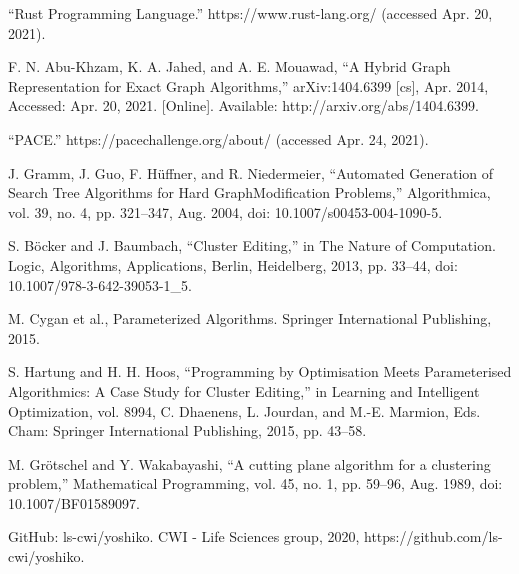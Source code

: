 \documentclass[12pt,oneside,english,parskip=full,headings=small]{scrbook}
\theoremstyle{definition}
\begin{document}
\begin{thebibliography}{99}
“Rust Programming Language.” https://www.rust-lang.org/ (accessed Apr. 20, 2021).

F. N. Abu-Khzam, K. A. Jahed, and A. E. Mouawad, “A Hybrid Graph Representation for Exact Graph
Algorithms,” arXiv:1404.6399 [cs], Apr. 2014, Accessed: Apr. 20, 2021. [Online]. Available:
http://arxiv.org/abs/1404.6399.

“PACE.” https://pacechallenge.org/about/ (accessed Apr. 24, 2021).

J. Gramm, J. Guo, F. Hüffner, and R. Niedermeier, “Automated Generation of Search Tree Algorithms
for Hard GraphModification Problems,” Algorithmica, vol. 39, no. 4, pp. 321–347, Aug. 2004, doi:
10.1007/s00453-004-1090-5.

S. Böcker and J. Baumbach, “Cluster Editing,” in The Nature of Computation. Logic, Algorithms,
Applications, Berlin, Heidelberg, 2013, pp. 33–44, doi: 10.1007/978-3-642-39053-1\_5.

M. Cygan et al., Parameterized Algorithms. Springer International Publishing, 2015.

S. Hartung and H. H. Hoos, “Programming by Optimisation Meets Parameterised Algorithmics: A Case
Study for Cluster Editing,” in Learning and Intelligent Optimization, vol. 8994, C. Dhaenens, L.
Jourdan, and M.-E. Marmion, Eds. Cham: Springer International Publishing, 2015, pp. 43–58.

M. Grötschel and Y. Wakabayashi, “A cutting plane algorithm for a clustering problem,”
Mathematical Programming, vol. 45, no. 1, pp. 59–96, Aug. 1989, doi: 10.1007/BF01589097.

GitHub: ls-cwi/yoshiko. CWI - Life Sciences group, 2020, https://github.com/ls-cwi/yoshiko.

\end{thebibliography}
\end{document}
